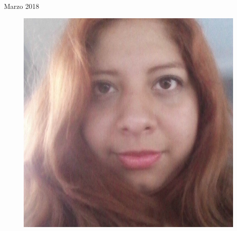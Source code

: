 \documentclass[12pt, fleqn]{article}                             %
\theoremstyle{break}                                            %
\begin{document}
\begin{titlepage}
    {\large \textsf{Marzo 2018}}                                  %

   
    \begin{figure}[H]
               \centering
                \includegraphics[scale=.3]{Laura.jpg}
            \end{figure}
\end{titlepage}


\restoregeometry                                                    %
\nopagecolor                                                        %




\tableofcontents{}
\label{sec:Index}

\clearpage
\end{document}
